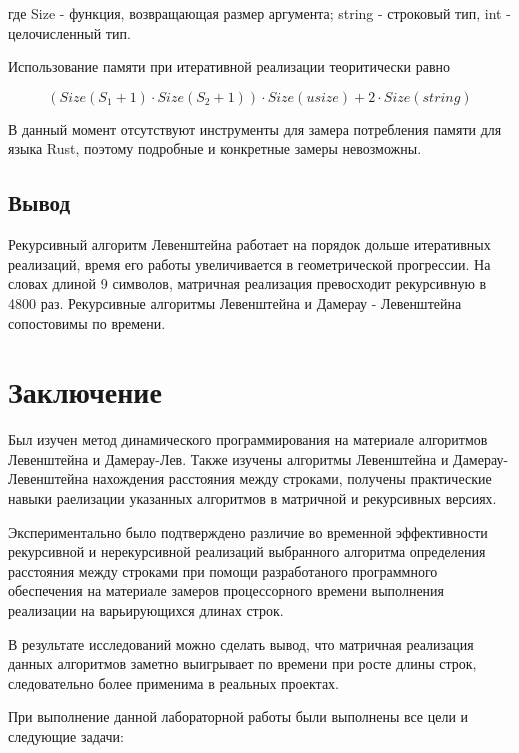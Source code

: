 \documentclass[12pt]{report}
\begin{document}
	\noindent
	где Size - функция, возвращающая размер аргумента; string - строковый тип, int - целочисленный тип.

	\par
	Использование памяти при итеративной реализации теоритически равно

	\begin{equation}
		(Size(S_{1} + 1) \cdot Size(S_{2} + 1)) \cdot Size(usize) + 2 \cdot Size(string)
	\end{equation}

	\par
	В данный момент отсутствуют инструменты для замера потребления памяти для языка Rust, поэтому подробные и конкретные замеры невозможны.

	\section{Вывод}

	\par
	Рекурсивный алгоритм Левенштейна работает на порядок дольше итеративных реализаций, время его работы увеличивается в геометрической прогрессии. На словах длиной 9 символов, матричная реализация превосходит рекурсивную в 4800 раз. Рекурсивные алгоритмы Левенштейна и Дамерау - Левенштейна сопостовимы по времени.

	\chapter*{Заключение}

	Был изучен метод динамического программирования на материале алгоритмов Левенштейна и Дамерау-Лев.
	Также изучены алгоритмы Левенштейна и Дамерау-Левенштейна нахождения расстояния между строками, получены практические навыки раелизации указанных алгоритмов
	в матричной  и рекурсивных версиях. 

	Экспериментально было подтверждено различие во временной эффективности рекурсивной и нерекурсивной реализаций выбранного алгоритма определения расстояния между строками при помощи разработаного программного обеспечения на материале замеров процессорного времени выполнения реализации на варьирующихся длинах строк. 

	В результате исследований можно сделать вывод, что матричная реализация данных алгоритмов заметно выигрывает по времени при росте длины строк, следовательно более применима в реальных проектах.
	
	При выполнение данной лабораторной работы были выполнены все цели и следующие задачи:
\end{document}
